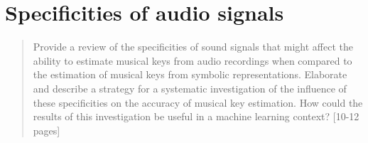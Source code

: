 \chapter{Specificities of audio signals}
\label{chap:chap4}

\begin{quote}
    Provide a review of the specificities of sound signals that might affect the ability to estimate musical keys from audio recordings when compared to the estimation of musical keys from symbolic representations. Elaborate and describe a strategy for a systematic investigation of the influence of these specificities on the accuracy of musical key estimation. How could the results of this investigation be useful in a machine learning context? [10-12 pages]
\end{quote}
\clearpage


